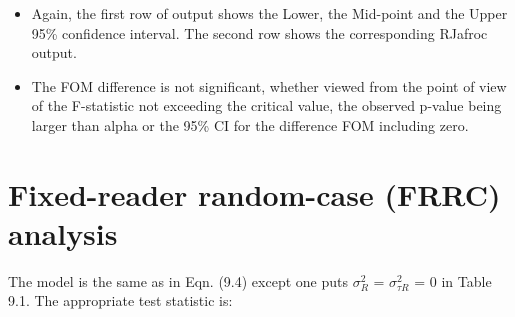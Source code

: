 \documentclass[
]{book}
\newenvironment{Shaded}{\begin{snugshade}}{\end{snugshade}}
\newcommand{\CommentTok}[1]{\textcolor[rgb]{0.56,0.35,0.01}{\textit{#1}}}
\newcommand{\DecValTok}[1]{\textcolor[rgb]{0.00,0.00,0.81}{#1}}
\newcommand{\KeywordTok}[1]{\textcolor[rgb]{0.13,0.29,0.53}{\textbf{#1}}}
\newcommand{\NormalTok}[1]{#1}
\newcommand{\OperatorTok}[1]{\textcolor[rgb]{0.81,0.36,0.00}{\textbf{#1}}}
\newcommand{\StringTok}[1]{\textcolor[rgb]{0.31,0.60,0.02}{#1}}
\begin{document}
\begin{Shaded}
\end{Shaded}

\begin{itemize}
\item
  Again, the first row of output shows the Lower, the Mid-point and the Upper 95\% confidence interval. The second row shows the corresponding RJafroc output.
\item
  The FOM difference is not significant, whether viewed from the point of view of the F-statistic not exceeding the critical value, the observed p-value being larger than alpha or the 95\% CI for the difference FOM including zero.
\end{itemize}

\hypertarget{fixed-reader-random-case-frrc-analysis}{%
\section{Fixed-reader random-case (FRRC) analysis}\label{fixed-reader-random-case-frrc-analysis}}

The model is the same as in Eqn. (9.4) except one puts \(\sigma_{R}^{2}\) = \(\sigma_{\tau R}^{2}\) = 0 in Table 9.1. The appropriate test statistic is:
\end{document}
